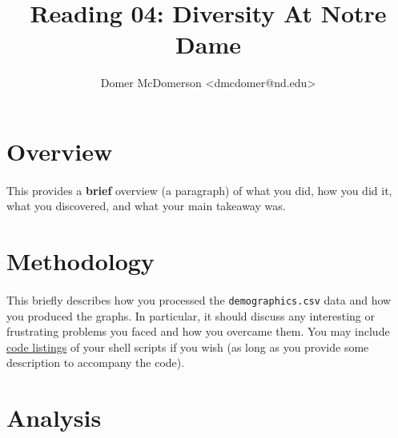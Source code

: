 \documentclass[letterpaper]{article}
\begin{document}

\title{Reading 04: Diversity At Notre Dame}
\date{}
\author{Domer McDomerson {\textless}dmcdomer@nd.edu{\textgreater}}

\maketitle


\section*{Overview}

\paragraph{}

This provides a {\bf brief} overview (a paragraph) of what you did, how you did
it, what you discovered, and what your main takeaway was.


\section*{Methodology}

\paragraph{}

This briefly describes how you processed the {\tt demographics.csv} data and
how you produced the graphs. In particular, it should discuss any interesting
or frustrating problems you faced and how you overcame them. You may include
\href{https://en.wikibooks.org/wiki/LaTeX/Source_Code_Listings}{code listings}
of your shell scripts if you wish (as long as you provide some description to
accompany the code).


\section*{Analysis}
\end{document}
